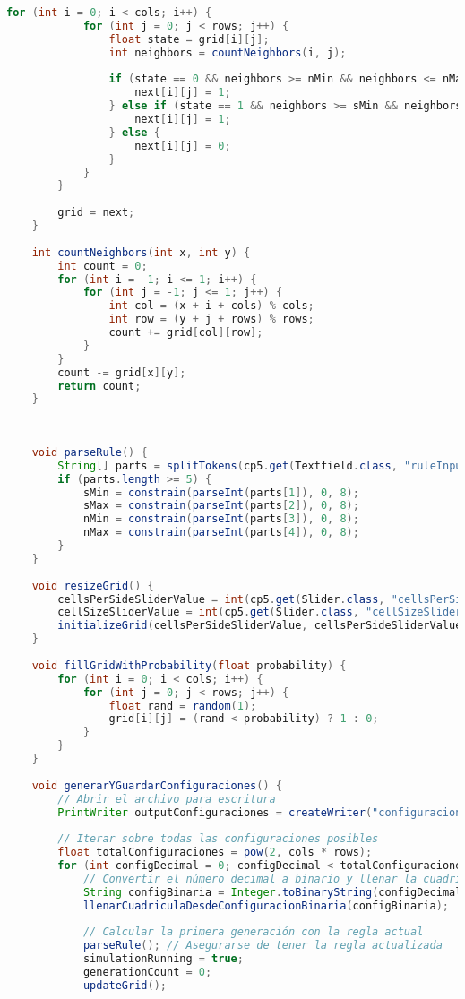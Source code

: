 \documentclass{article}
\begin{document}
\begin{lstlisting}[language=Java, basicstyle=\tiny, breaklines=true, breakatwhitespace=true]
 		for (int i = 0; i < cols; i++) {
 			for (int j = 0; j < rows; j++) {
 				float state = grid[i][j];
 				int neighbors = countNeighbors(i, j);
 				
 				if (state == 0 && neighbors >= nMin && neighbors <= nMax) {
 					next[i][j] = 1;
 				} else if (state == 1 && neighbors >= sMin && neighbors <= sMax) {
 					next[i][j] = 1;
 				} else {
 					next[i][j] = 0;
 				}
 			}
 		}
 		
 		grid = next;
 	}
 	
 	int countNeighbors(int x, int y) {
 		int count = 0;
 		for (int i = -1; i <= 1; i++) {
 			for (int j = -1; j <= 1; j++) {
 				int col = (x + i + cols) % cols;
 				int row = (y + j + rows) % rows;
 				count += grid[col][row];
 			}
 		}
 		count -= grid[x][y];
 		return count;
 	}
 	
 	
 	
 	void parseRule() {
 		String[] parts = splitTokens(cp5.get(Textfield.class, "ruleInput").getText(), "(),");
 		if (parts.length >= 5) {
 			sMin = constrain(parseInt(parts[1]), 0, 8);
 			sMax = constrain(parseInt(parts[2]), 0, 8);
 			nMin = constrain(parseInt(parts[3]), 0, 8);
 			nMax = constrain(parseInt(parts[4]), 0, 8);
 		}
 	}
 	
 	void resizeGrid() {
 		cellsPerSideSliderValue = int(cp5.get(Slider.class, "cellsPerSideSlider").getValue());
 		cellSizeSliderValue = int(cp5.get(Slider.class, "cellSizeSlider").getValue());
 		initializeGrid(cellsPerSideSliderValue, cellsPerSideSliderValue);
 	}
 	
 	void fillGridWithProbability(float probability) {
 		for (int i = 0; i < cols; i++) {
 			for (int j = 0; j < rows; j++) {
 				float rand = random(1);
 				grid[i][j] = (rand < probability) ? 1 : 0;
 			}
 		}
 	}
 	
 	void generarYGuardarConfiguraciones() {
 		// Abrir el archivo para escritura
 		PrintWriter outputConfiguraciones = createWriter("configuraciones.txt");
 		
 		// Iterar sobre todas las configuraciones posibles
 		float totalConfiguraciones = pow(2, cols * rows);
 		for (int configDecimal = 0; configDecimal < totalConfiguraciones; configDecimal++) {
 			// Convertir el número decimal a binario y llenar la cuadrícula
 			String configBinaria = Integer.toBinaryString(configDecimal);
 			llenarCuadriculaDesdeConfiguracionBinaria(configBinaria);
 			
 			// Calcular la primera generación con la regla actual
 			parseRule(); // Asegurarse de tener la regla actualizada
 			simulationRunning = true;
 			generationCount = 0;
 			updateGrid();
 			

\end{lstlisting}
\end{document}
